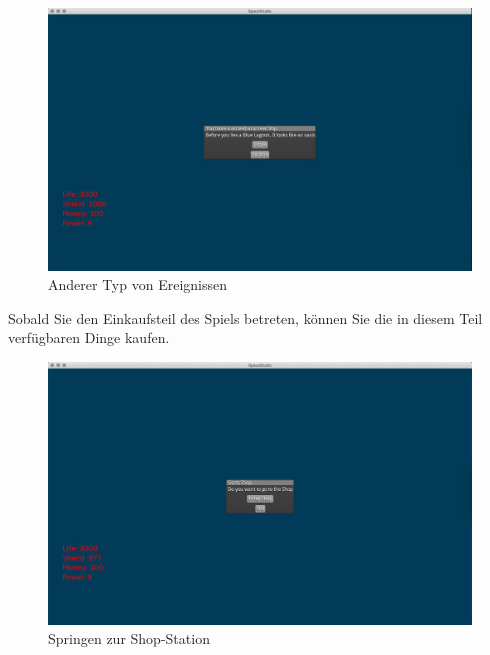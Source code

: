 \documentclass[12pt]{article}
\begin{document}
\begin{figure}[htp]
\centering
\includegraphics[scale=0.4]{TestProtocolBilder/otherEreignisse.jpg}
\caption{Anderer Typ von Ereignissen}
\end{figure}
Sobald Sie den Einkaufsteil des Spiels betreten, können Sie die in diesem Teil verfügbaren Dinge kaufen.
\begin{figure}[htp]
\centering
\includegraphics[scale=0.4]{TestProtocolBilder/shopPlanetJump.jpg}
\caption{Springen zur Shop-Station}
\end{figure}
\newpage
\end{document}
